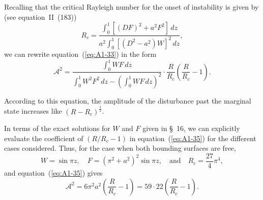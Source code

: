 Recalling that the critical Rayleigh number for the onset of instability is given by (see equation~II~(183))
\begin{equation}
\label{eq:A1-34}
R_c = \frac{\int_0^1 [(DF)^2 + a^2 F^2] \, dz}{a^2 \int_0^1 [(D^2 - a^2)W]^2 \, dz},
\end{equation}
we can rewrite equation~(\ref{eq:A1-33}) in the form
\begin{equation}
\label{eq:A1-35}
\mathscr{A}^2 = \frac{\displaystyle\int_0^1 WF \, dz}{\displaystyle\int_0^1 W^2 F^2 \, dz - \left( \int_0^1 WF \, dz \right)^{\!2}} \cdot \frac{R}{R_c}\left( \frac{R}{R_c} - 1 \right).
\end{equation}

According to this equation, the amplitude of the disturbance past the marginal state increases like $(R - R_c)^{\frac{1}{2}}$.

In terms of the exact solutions for $W$ and $F$ given in \S~16, we can explicitly evaluate the coefficient of $(R/R_c - 1)$ in equation~(\ref{eq:A1-35}) for the different cases considered. Thus, for the case when both bounding surfaces are free,
\begin{equation}
\label{eq:A1-36}
W = \sin \pi z, \quad F = (\pi^2 + a^2)^2 \sin \pi z, \quad \text{and} \quad R_c = \frac{27}{4}\pi^4,
\end{equation}
and equation~(\ref{eq:A1-35}) gives
\begin{equation}
\label{eq:A1-37}
\mathscr{A}^2 = 6\pi^2 a^2 \left( \frac{R}{R_c} - 1 \right) = 59{\cdot}22 \left( \frac{R}{R_c} - 1 \right).
\end{equation}

